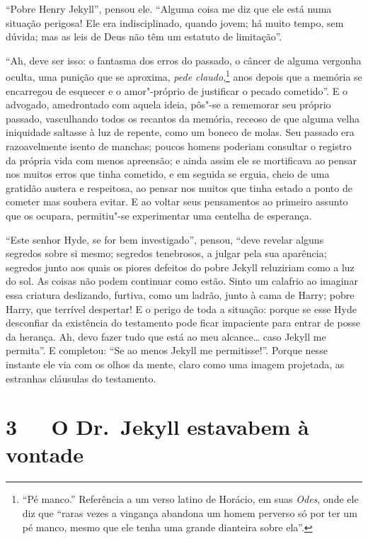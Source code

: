 “Pobre Henry Jekyll”, pensou ele.  “Alguma coisa me diz que ele está
numa situação perigosa!  Ele era indisciplinado, quando jovem; há muito
tempo, sem dúvida; mas as leis de Deus não têm um estatuto de
limitação”.  

“Ah, deve ser isso: o fantasma dos erros do passado, o câncer de alguma
vergonha oculta, uma punição que se aproxima, \textit{pede claudo},\footnote{
“Pé manco.” Referência a um verso latino de Horácio, em suas \textit{Odes}, onde
ele diz que “raras vezes a vingança abandona um homem perverso só por
ter um pé manco, mesmo que ele tenha uma grande dianteira sobre ela”.}
anos depois que a memória se encarregou de esquecer e o
amor"-próprio de justificar o pecado cometido”.  E o advogado,
amedrontado com aquela ideia, pôs"-se a rememorar seu próprio passado,
vasculhando todos os recantos da memória, receoso de que alguma velha
iniquidade saltasse à luz de repente, como um boneco de molas.  Seu
passado era razoavelmente isento de manchas; poucos homens poderiam
consultar o registro da própria vida com menos apreensão; e ainda assim
ele se mortificava ao pensar nos muitos erros que tinha cometido, e em
seguida se erguia, cheio de uma gratidão austera e respeitosa, ao
pensar nos muitos que tinha estado a ponto de cometer mas soubera
evitar.  E ao voltar seus pensamentos ao primeiro assunto que os
ocupara, permitiu"-se experimentar uma centelha de esperança.

“Este senhor Hyde, se for bem investigado”, pensou, “deve revelar alguns
segredos sobre si mesmo; segredos tenebrosos, a julgar pela sua
aparência; segredos junto aos quais os piores defeitos do pobre Jekyll
reluziriam como a luz do sol.  As coisas não podem continuar como
estão. Sinto um calafrio ao imaginar essa criatura deslizando, furtiva,
como um ladrão, junto à cama de Harry; pobre Harry, que terrível
despertar! E o perigo de toda a situação: porque se esse Hyde
desconfiar da existência do testamento pode ficar impaciente para
entrar de posse da herança.  Ah, devo fazer tudo que está ao meu
alcance\ldots{} caso Jekyll me permita”.  E completou: “Se ao menos Jekyll
me permitisse!”.  Porque nesse instante ele via com os olhos da mente,
claro como uma imagem projetada, as estranhas cláusulas do testamento.


\chapter[3\ \ \ O Dr.~Jekyll estava bem à vontade]{3\ \ \ O Dr.~Jekyll estava\break bem à vontade}

